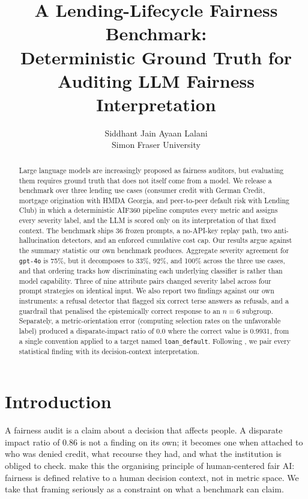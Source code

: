 \documentclass[10pt,letterpaper]{article}
\title{\bfseries A Lending-Lifecycle Fairness Benchmark:\\
Deterministic Ground Truth for Auditing LLM Fairness Interpretation}
\author{%
  Siddhant Jain \quad Ayaan Lalani\\
  Simon Fraser University
}
\date{}
\begin{document}
\maketitle

\begin{abstract}
Large language models are increasingly proposed as fairness auditors, but
evaluating them requires ground truth that does not itself come from a model.
We release a benchmark over three lending use cases (consumer credit with
German Credit, mortgage origination with HMDA Georgia, and peer-to-peer
default risk with Lending Club) in which a deterministic AIF360 pipeline computes every
metric and assigns every severity label, and the LLM is scored only on its
interpretation of that fixed context. The benchmark ships 36 frozen prompts, a
no-API-key replay path, two anti-hallucination detectors, and an enforced
cumulative cost cap. Our results argue against
the summary statistic our own benchmark produces. Aggregate severity agreement
for \texttt{gpt-4o} is 75\%, but it decomposes to 33\%, 92\%, and 100\% across
the three use cases, and that ordering tracks how discriminating each underlying
classifier is rather than model capability. Three of nine attribute pairs
changed severity label across four prompt strategies on identical input.
We also report two findings against our own instruments: a
refusal detector that flagged six correct terse answers as refusals, and a
guardrail that penalised the epistemically correct response to an $n{=}6$
subgroup. Separately, a metric-orientation error (computing selection rates
on the unfavorable label) produced a disparate-impact ratio of $0.0$ where
the correct value is $0.9931$, from a single convention applied to a target
named \texttt{loan\_default}. Following \citet{lee2020}, we pair every
statistical finding with its decision-context interpretation.
\end{abstract}

\section{Introduction}

A fairness audit is a claim about a decision that affects people. A disparate
impact ratio of $0.86$ is not a finding on its own; it becomes one when attached
to who was denied credit, what recourse they had, and what the institution is
obliged to check. \citet{lee2020} make this the organising principle of
human-centered fair AI: fairness is defined relative to a human decision
context, not in metric space. We take that framing seriously as a constraint on
what a benchmark can claim.
\end{document}
